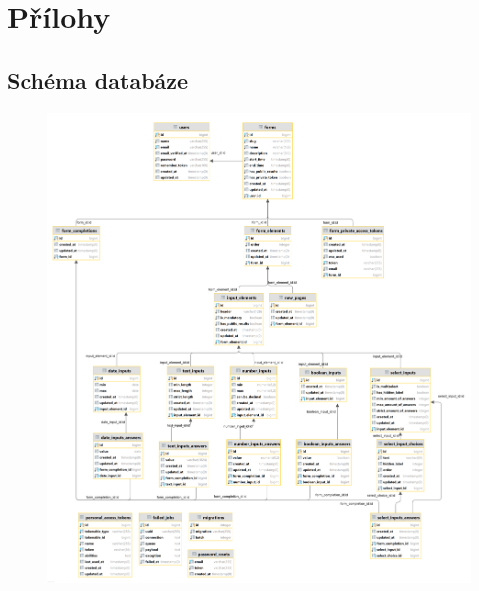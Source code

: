 \chapter{Přílohy}
	\section{Schéma databáze}
	\begin{figure}[hbtp]
		\centering %
		\includegraphics[height=0.61\paperheight]{img/db_diagram.png} %
		\label{fig:db_diagram} %
	\end{figure}

	\newpage
	

	